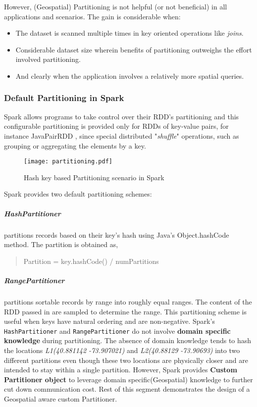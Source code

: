 \documentclass[article,type=msc,colorback,12pt,accentcolor=tud1d]{tudthesis}
\begin{document}
			However, (Geospatial) Partitioning is not helpful (or not beneficial) in all applications and scenarios. The gain is considerable when: \cite{sparkbook}
			\begin{itemize}
				\item The dataset is scanned multiple times in key oriented operations like \textit{joins}.
				\item Considerable dataset size wherein benefits of partitioning outweighs the effort involved partitioning.
				\item And clearly when the application involves a relatively more spatial queries.
			\end{itemize}
			
		\subsubsection{Default Partitioning in Spark}
			\par Spark allows programs to take control over their RDD's partitioning and this configurable partitioning is provided only for RDDs of key-value pairs, for instance JavaPairRDD \cite{sparkapiPairRDD}, since special distributed "\textit{shuffle}" operations, such as grouping or aggregating the elements by a key.\\
			
				\begin{figure}[h]
					\centering
					\texttt{[image: partitioning.pdf]}
					\caption{Hash key based Partitioning scenario in Spark}
					\label{fig:partitioning}
				\end{figure}
				
			
			\par Spark provides two default partitioning schemes:
			\subparagraph{HashPartitioner} partitions records based on their key's hash using Java's Object.hashCode method. The partition is obtained as,
			
			\begin{quote}
				\centering Partition = key.hashCode() / numPartitions
			\end{quote}
			
			\subparagraph{RangePartitioner} partitions sortable records by range into roughly equal ranges. The content of the RDD passed in are sampled to determine the range\cite{sparkapiPartitioner}. This partitioning scheme is useful when keys have natural ordering and are non-negative.
			\clearpage
			Spark's \texttt{HashPartitioner} and \texttt{RangePartitioner} do not involve \textbf{domain specific knowledge} during partitioning. The absence of domain knowledge tends to hash the locations \textit{L1(40.881142 -73.907021)} and \textit{L2(40.88129 -73.90693)} into two different partitions even though these two locations are physically closer and are intended to stay within a single partition. However, Spark provides \textbf{Custom Partitioner object} to leverage domain specific(Geospatial) knowledge to further cut down communication cost. Rest of this segment demonstrates the design of a Geospatial aware custom Partitioner.
			
\end{document}
